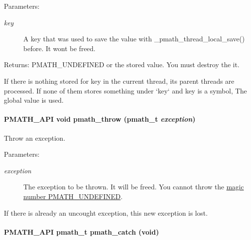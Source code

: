 \begin{Desc}
\item[Parameters:]
\begin{description}
\item[{\em key}]A key that was used to save the value with \_\-pmath\_\-thread\_\-local\_\-save() before. It wont be freed. \end{description}
\end{Desc}
\begin{Desc}
\item[Returns:]PMATH\_\-UNDEFINED or the stored value. You must destroy the it.\end{Desc}
If there is nothing stored for key in the current thread, its parent threads are processed. If none of them stores something under `key` and key is a symbol, The global value is used. \hypertarget{group__threads_gf1aa6d6603faaa4120207be6108e356c}{
\paragraph[{pmath\_\-throw}]{\setlength{\rightskip}{0pt plus 5cm}PMATH\_\-API void pmath\_\-throw ({\bf pmath\_\-t} {\em exception})}\hfill}
\label{group__threads_gf1aa6d6603faaa4120207be6108e356c}


Throw an exception. 

\begin{Desc}
\item[Parameters:]
\begin{description}
\item[{\em exception}]The exception to be thrown. It will be freed. You cannot throw the \hyperlink{group__objects_ge2646df76dcb0113715322b13a1f36f0}{magic number PMATH\_\-UNDEFINED}.\end{description}
\end{Desc}
If there is already an uncought exception, this new exception is lost. \hypertarget{group__threads_gf791e0088342297d6511a4481421f446}{
\paragraph[{pmath\_\-catch}]{\setlength{\rightskip}{0pt plus 5cm}PMATH\_\-API {\bf pmath\_\-t} pmath\_\-catch (void)}\hfill}
\label{group__threads_gf791e0088342297d6511a4481421f446}


